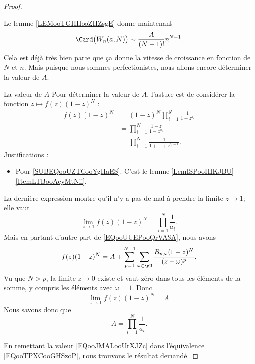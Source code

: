 \begin{proof}
\begin{subproof}
        Le lemme \ref{LEMooTGHHooZHZsgE} donne maintenant
        \begin{equation}        \label{EQooTPXCooGHSzoP}
            \Card\big( W_n(a,N) \big)\sim \frac{ A }{ (N-1)! }n^{N-1}.
        \end{equation}
        Cela est déjà très bien parce que ça donne la vitesse de croissance en fonction de \( N\) et \( n\). Mais puisque nous sommes perfectionistes, nous allons encore déterminer la valeur de \( A\).
    \item[La valeur de \( A\)]
        Pour déterminer la valeur de \( A\), l'astuce est de considérer la fonction \( z\mapsto f(z)(1-z)^N\) :
        \begin{subequations}
            \begin{align}
                f(z)(1-z)^N&=(1-z)^N\prod_{i=1}^N\frac{1}{ 1-z^{a_i} }\\
                &=\prod_{i=1}^N\frac{ 1-z }{ 1-z^{a_i} }\\
                &=\prod_{i=1}^N\frac{1}{ 1+\ldots +z^{a_i-1} }.      \label{SUBEQooUZTCooYgHaES}
            \end{align}
        \end{subequations}
        Justifications :
        \begin{itemize}
            \item Pour \eqref{SUBEQooUZTCooYgHaES}. C'est le lemme \ref{LemISPooHIKJBU}\ref{ItemLTBooAcyMtNii}.
        \end{itemize}
        La dernière expression montre qu'il n'y a pas de mal à prendre la limite \( z\to 1\); elle vaut
        \begin{equation}
            \lim_{z\to 1} f(z)(1-z)^N=\prod_{i=1}^N\frac{1}{ a_i }.
        \end{equation}
        Mais en partant d'autre part de \eqref{EQooUUEPooQrVASA}, nous avons
        \begin{equation}
            f(z)(1-z)^N=A+\sum_{p=1}^{N-1}\sum_{\omega\in \gU}\frac{ B_{p,\omega}(1-z)^N }{ (z-\omega)^p }.
        \end{equation}
        Vu que \( N>p\), la limite \( z\to 0\) existe et vaut zéro dans tous les éléments de la somme, y compris les éléments avec \( \omega=1\). Donc
        \begin{equation}
            \lim_{z\to 1}f(z)(1-z)^N=A.
        \end{equation}
        Nous savons donc que
        \begin{equation}        \label{EQooJMALooUrXJZc}
            A=\prod_{i=1}^N\frac{1}{ a_i }.
        \end{equation}
    \end{subproof}
    En remettant la valeur \eqref{EQooJMALooUrXJZc} dans l'équivalence \eqref{EQooTPXCooGHSzoP}, nous trouvons le résultat demandé.
\end{proof}

